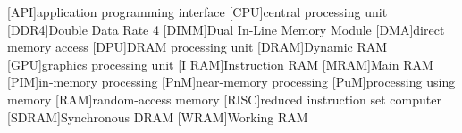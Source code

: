 \label{apx:acronyms}

\begin{acronym}[SDRAM]
	[API]{application programming interface}
	[CPU]{central processing unit}
	[DDR4]{Double Data Rate 4}
	[DIMM]{Dual In-Line Memory Module}
	[DMA]{direct memory access}
	[DPU]{\acs*{DRAM} processing unit}
	[DRAM]{Dynamic \acs*{RAM}}
	[GPU]{graphics processing unit}
	[I\kern1pt RAM]{Instruction \acs*{RAM}}
	[MRAM]{Main \acs*{RAM}}
	[PIM]{in-memory processing}
	[PnM]{near-memory processing}
	[PuM]{processing using memory}
	[RAM]{random-access memory}
	[RISC]{reduced instruction set computer}
	[SDRAM]{Synchronous \acs*{DRAM}}
	[WRAM]{Working \acs*{RAM}}
\end{acronym}
